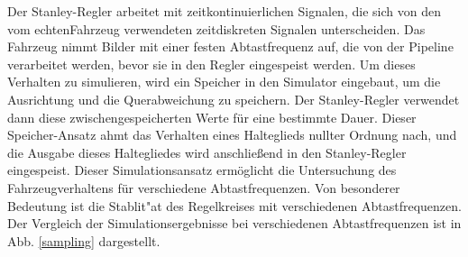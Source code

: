 \documentclass[arbeit=studie,oneside,BCOR=12mm]{ArbeitRST}
\begin{document}
Der Stanley-Regler arbeitet mit zeitkontinuierlichen Signalen, die sich von den
vom \glqq echten\grqq Fahrzeug verwendeten zeitdiskreten Signalen
unterscheiden. Das Fahrzeug nimmt Bilder mit einer festen Abtastfrequenz auf,
die von der Pipeline verarbeitet werden, bevor sie in den Regler eingespeist
werden. Um dieses Verhalten zu simulieren, wird ein Speicher in den Simulator
eingebaut, um die Ausrichtung und die Querabweichung zu speichern. Der
Stanley-Regler verwendet dann diese zwischengespeicherten Werte für eine
bestimmte Dauer. Dieser Speicher-Ansatz ahmt das Verhalten eines Halteglieds
nullter Ordnung nach, und die Ausgabe dieses Haltegliedes wird anschließend in
den Stanley-Regler eingespeist. Dieser Simulationsansatz ermöglicht die
Untersuchung des Fahrzeugverhaltens für verschiedene Abtastfrequenzen. Von
besonderer Bedeutung ist die Stablit"at des Regelkreises mit verschiedenen
Abtastfrequenzen. Der Vergleich der Simulationsergebnisse bei
verschiedenen Abtastfrequenzen ist in Abb. \ref{sampling} dargestellt. 
\end{document}
